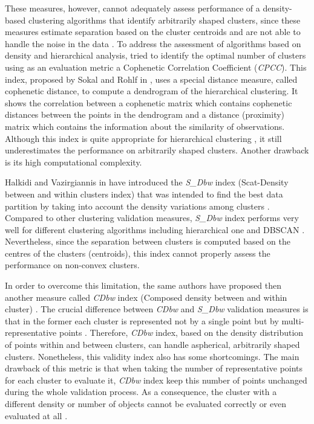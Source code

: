 \documentclass[fontsize=12pt,a4paper,twoside,openany]{scrbook}
\begin{document}
These measures, however, cannot adequately assess performance of a density-based clustering algorithms that identify arbitrarily shaped clusters, since these measures estimate separation based on the cluster centroids and are not able to handle the noise in the data \parencite{Moulavi14}. To address the assessment of algorithms based on density and hierarchical analysis, \textcite{Saracli13} tried to identify the optimal number of clusters using as an evaluation metric a Cophenetic Correlation Coefficient (\emph{CPCC}). This index, proposed by Sokal and Rohlf in \cite*{Sokal62}, uses a special distance measure, called  cophenetic distance, to compute a dendrogram of the hierarchical clustering. It shows the correlation between a cophenetic matrix which contains cophenetic distances between the points in the dendrogram and a distance (proximity) matrix which contains the information about the similarity of observations. Although this index is quite appropriate for hierarchical clustering \parencite{Palacio19}, it still underestimates the performance on arbitrarily shaped clusters. Another drawback is its high computational complexity.

Halkidi and Vazirgiannis in \cite*{Halkidi01b} have introduced the \emph{S\_Dbw} index (Scat-Density between and within clusters index) that was intended to find the best data partition by taking into account the density variations among clusters \parencite{Halkidi01b}. Compared to other clustering validation measures, \emph{S\_Dbw} index performs very well for different clustering algorithms including hierarchical one and DBSCAN \parencite{Liu10}. Nevertheless, since the separation between clusters is computed based on the centres of the clusters (centroids), this index cannot properly assess the performance on non-convex clusters.

In order to overcome this limitation, the same authors have proposed then another measure called \emph{CDbw} index (Composed density between and within cluster) \parencite{Halkidi08}. The crucial difference between \emph{CDbw} and \emph{S\_Dbw} validation measures is that in the former each cluster is represented not by a single point but by multi-representative points \parencite{Halkidi08}. Therefore, \emph{CDbw} index, based on the density distribution of points within and between clusters, can handle aspherical, arbitrarily shaped clusters. Nonetheless, this validity index also has some shortcomings. The main drawback of this metric is that when taking the number of representative points for each cluster to evaluate it, \emph{CDbw} index keep this number of points unchanged during the whole validation process. As a consequence, the cluster with a different density or number of objects cannot be evaluated correctly or even evaluated at all \parencite{Moulavi14}.
\end{document}
